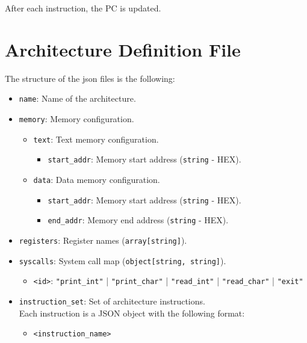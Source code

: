 After each instruction, the PC is updated.



\section*{Architecture Definition File}
The structure of the \gls{json} files is the following:
\begin{itemize}[nosep,noitemsep]
  \item \texttt{name}: Name of the architecture.
  \item \texttt{memory}: Memory configuration.
    \begin{itemize}[nosep,noitemsep]
      \item \texttt{text}: Text memory configuration.
        \begin{itemize}[nosep,noitemsep]
          \item \texttt{start\_addr}: Memory start address (\texttt{string} - HEX).
        \end{itemize}
      \item \texttt{data}: Data memory configuration.
        \begin{itemize}[nosep,noitemsep]
          \item \texttt{start\_addr}: Memory start address (\texttt{string} - HEX).
          \item \texttt{end\_addr}: Memory end address (\texttt{string} - HEX).
        \end{itemize}
    \end{itemize}
  \item \texttt{registers}: Register names (\texttt{array[string]}).
  \item \texttt{syscalls}: System call map (\texttt{object[string, string]}).
    \begin{itemize}[nosep,noitemsep]
      \item \texttt{<id>}: \texttt{"print\_int"} | \texttt{"print\_char"} | \texttt{"read\_int"} | \texttt{"read\_char"} | \texttt{"exit"}
    \end{itemize}
  \item \texttt{instruction\_set}: Set of architecture instructions.\\
    Each instruction is a JSON object with the following format:
    \begin{itemize}[nosep,noitemsep]
      \item \texttt{<instruction\_name>}
      \begin{itemize}

\end{itemize}
\end{itemize}
\end{itemize}
